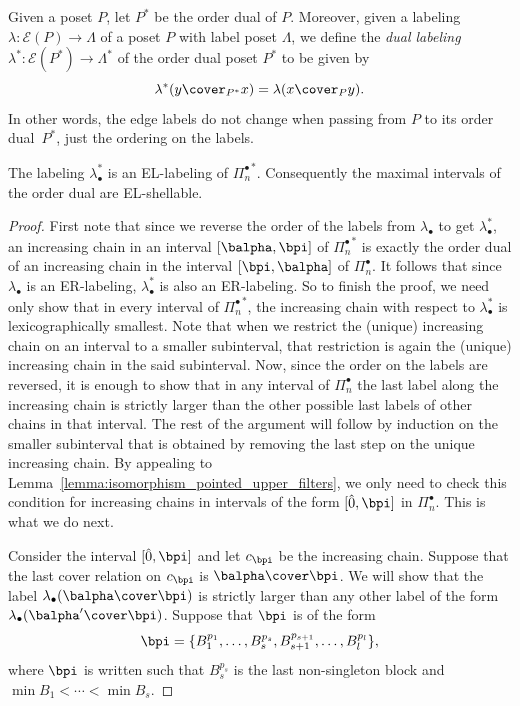 Given a poset $P$, let $P^*$ be the order dual of $P$.  Moreover, given a labeling $\lambda:\mathcal{E}(P)\rightarrow \Lambda$ of a poset $P$ with label poset $\Lambda$, we define the \emph{dual labeling} $\lambda^*:\mathcal{E}(P^*)\rightarrow \Lambda^*$ of the order dual poset $P^*$ to be given by
$$
\lambda^*(y\cover_{P^*} x)  = \lambda(x\cover_{P} y).
$$
In other words, the edge labels do not change when passing from $P$ to its order dual~$P^*$, just the ordering on the labels.  


\begin{theo}\label{theorem:pointed_dual_EL_labeling}
The labeling  $\lambda^*_{\bullet}$  is an EL-labeling  of ${\Pi_n^{\bullet}}^*$.  Consequently the maximal intervals of the order dual are EL-shellable.
\end{theo}
\begin{proof}

First note that since we reverse the order of the labels from  $\lambda_{\bullet}$  to get $\lambda^*_{\bullet}$,  an  increasing chain in an interval $[\balpha, \bpi]$ of ${\Pi_n^{\bullet}}^*$ is exactly the order dual of an  increasing chain in the interval $[\bpi, \balpha]$ of  ${\Pi_n^{\bullet}}$.  It follows that since  $\lambda_\bullet$ is an ER-labeling,   $\lambda^*_{\bullet}$ is also an ER-labeling.  So to finish the proof, we need only show that in every interval of ${\Pi_n^{\bullet}}^*$, the increasing chain with respect to $\lambda^*_\bullet$ is lexicographically smallest. Note that when we restrict the (unique) increasing chain on an interval to a smaller subinterval, that restriction is again the (unique) increasing chain in the said subinterval. Now, since the order on the labels are reversed, it is enough to show that in any interval  of ${\Pi_n^{\bullet}}$ the last label along the increasing chain is strictly larger than the other possible last labels of other chains in that interval. The rest of the argument will follow by induction on the smaller subinterval that is obtained by removing the last step on the unique increasing chain.  By appealing to Lemma~\ref{lemma:isomorphism_pointed_upper_filters}, we  only need to check this   condition for increasing chains   in intervals of the form $[\hat{0},\bpi]$ in ${\Pi_n^{\bullet}}$. This is what we do next.


Consider the interval $[\hat{0}, \bpi]$ and let $c_{\bpi}$  be the increasing chain.  Suppose that the last cover relation on $c_{\bpi}$  is $\balpha\cover \bpi$.  We will show that the label $\lambda_\bullet(\balpha\cover \bpi)$ is strictly larger than any other label of the form $\lambda_\bullet(\balpha'\cover \bpi)$.    Suppose that $\bpi$   is of the form 
$$
\bpi=\{B_1^{p_1},\dots,B_s^{p_s},B_{s+1}^{p_{s+1}},\dots,B_l^{p_l}\},
$$
where $\bpi$ is written such that $B_s^{p_s}$ is the last non-singleton block and $\min B_1 <\cdots <\min B_s$.


\end{proof}
